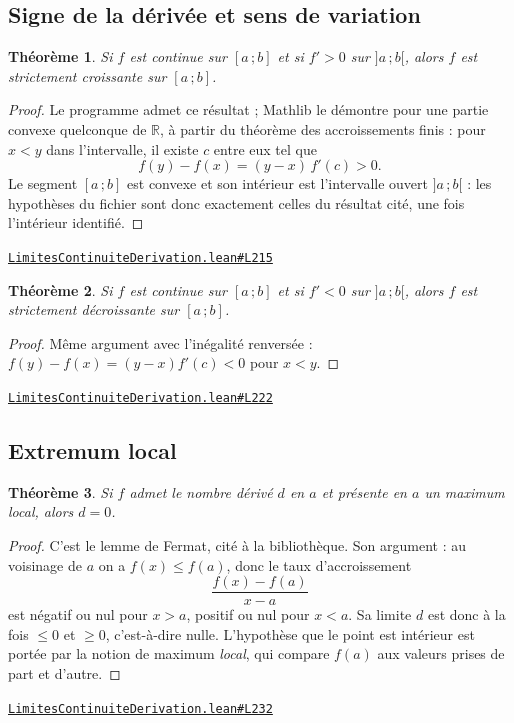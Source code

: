 \documentclass[11pt,a4paper]{article}
\theoremstyle{definition}
\theoremstyle{plain}
\newtheorem{theoreme}{Théorème}
\newcommand{\source}[2]{\par\smallskip\noindent\hfill{\footnotesize\href{#1}{\texttt{#2}}}\par\smallskip}
\begin{document}
\subsection{Signe de la dérivée et sens de variation}

\begin{theoreme}
Si $f$ est continue sur $[a\,;b]$ et si $f' > 0$ sur $]a\,;b[$, alors $f$ est strictement
croissante sur $[a\,;b]$.
\end{theoreme}

\begin{proof}
Le programme admet ce résultat ; Mathlib le démontre pour une partie convexe quelconque de
$\mathbb{R}$, à partir du théorème des accroissements finis : pour $x < y$ dans
l'intervalle, il existe $c$ entre eux tel que
\[ f(y) - f(x) = (y - x)\,f'(c) > 0 . \]
Le segment $[a\,;b]$ est convexe et son intérieur est l'intervalle ouvert $]a\,;b[$ : les
hypothèses du fichier sont donc exactement celles du résultat cité, une fois l'intérieur
identifié.
\end{proof}
\source{https://github.com/Commutator-IO/learn-lean/blob/main/cours/02-lycee/04-limites-continuite-derivation/LimitesContinuiteDerivation.lean\#L215}{LimitesContinuiteDerivation.lean\#L215}

\begin{theoreme}
Si $f$ est continue sur $[a\,;b]$ et si $f' < 0$ sur $]a\,;b[$, alors $f$ est strictement
décroissante sur $[a\,;b]$.
\end{theoreme}

\begin{proof}
Même argument avec l'inégalité renversée : $f(y) - f(x) = (y - x)f'(c) < 0$ pour $x < y$.
\end{proof}
\source{https://github.com/Commutator-IO/learn-lean/blob/main/cours/02-lycee/04-limites-continuite-derivation/LimitesContinuiteDerivation.lean\#L222}{LimitesContinuiteDerivation.lean\#L222}

\subsection{Extremum local}

\begin{theoreme}
Si $f$ admet le nombre dérivé $d$ en $a$ et présente en $a$ un maximum local, alors
$d = 0$.
\end{theoreme}

\begin{proof}
C'est le lemme de Fermat, cité à la bibliothèque. Son argument : au voisinage de $a$ on a
$f(x) \le f(a)$, donc le taux d'accroissement
\[ \frac{f(x) - f(a)}{x - a} \]
est négatif ou nul pour $x > a$, positif ou nul pour $x < a$. Sa limite $d$ est donc à la
fois $\le 0$ et $\ge 0$, c'est-à-dire nulle. L'hypothèse que le point est intérieur est
portée par la notion de maximum \emph{local}, qui compare $f(a)$ aux valeurs prises de part
et d'autre.
\end{proof}
\source{https://github.com/Commutator-IO/learn-lean/blob/main/cours/02-lycee/04-limites-continuite-derivation/LimitesContinuiteDerivation.lean\#L232}{LimitesContinuiteDerivation.lean\#L232}
\end{document}
